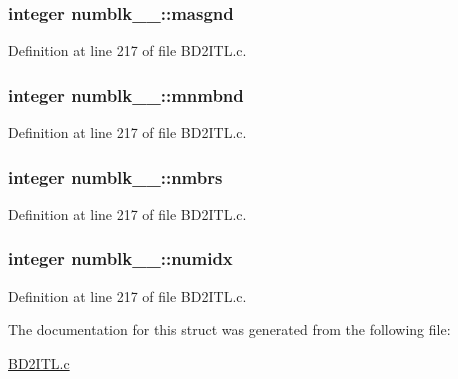 \subsubsection[{\texorpdfstring{masgnd}{masgnd}}]{\setlength{\rightskip}{0pt plus 5cm}integer numblk\+\_\+\_\+\+::masgnd}\hypertarget{structnumblk__1___a7a6517f63691ed178f4972441a04e4d7}{}\label{structnumblk__1___a7a6517f63691ed178f4972441a04e4d7}


Definition at line 217 of file B\+D2\+I\+T\+L.\+c.

\subsubsection[{\texorpdfstring{mnmbnd}{mnmbnd}}]{\setlength{\rightskip}{0pt plus 5cm}integer numblk\+\_\+\_\+\+::mnmbnd}\hypertarget{structnumblk__1___a0b97e1e4f394909609eed186f4797bf3}{}\label{structnumblk__1___a0b97e1e4f394909609eed186f4797bf3}


Definition at line 217 of file B\+D2\+I\+T\+L.\+c.

\subsubsection[{\texorpdfstring{nmbrs}{nmbrs}}]{\setlength{\rightskip}{0pt plus 5cm}integer numblk\+\_\+\_\+\+::nmbrs}\hypertarget{structnumblk__1___a054d3628bbe6eeeef320b7ac27b3c111}{}\label{structnumblk__1___a054d3628bbe6eeeef320b7ac27b3c111}


Definition at line 217 of file B\+D2\+I\+T\+L.\+c.

\subsubsection[{\texorpdfstring{numidx}{numidx}}]{\setlength{\rightskip}{0pt plus 5cm}integer numblk\+\_\+\_\+\+::numidx}\hypertarget{structnumblk__1___a6aef8abc70f1a5323ca22a2092acb15d}{}\label{structnumblk__1___a6aef8abc70f1a5323ca22a2092acb15d}


Definition at line 217 of file B\+D2\+I\+T\+L.\+c.



The documentation for this struct was generated from the following file\+:\begin{DoxyCompactItemize}
\item 
\hyperlink{BD2ITL_8c}{B\+D2\+I\+T\+L.\+c}\end{DoxyCompactItemize}
